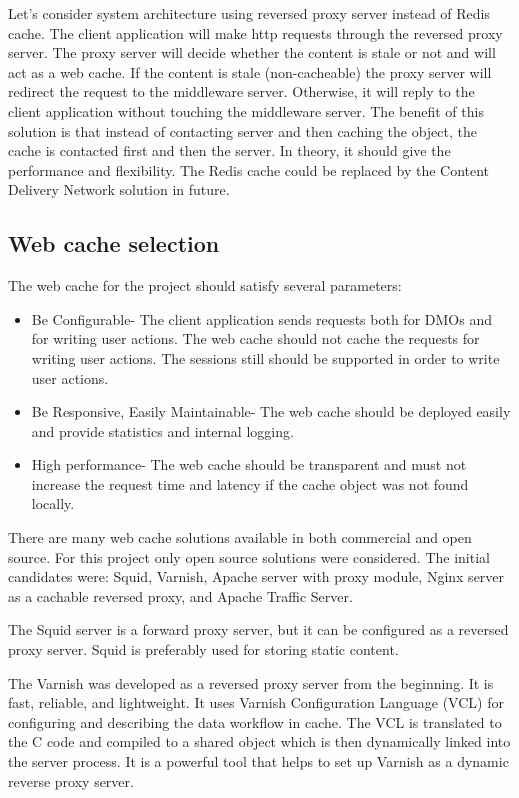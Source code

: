 Let’s consider system architecture using reversed proxy server instead of Redis cache. The client application will make http requests through the reversed proxy server. The proxy server will decide whether the content is stale or not and will act as a web cache. If the content is stale (non-cacheable) the proxy server will redirect the request to the middleware server. Otherwise, it will reply to the client application without touching the middleware server. The benefit of this solution is that instead of contacting server and then caching the object, the cache is contacted first and then the server. In theory, it should give the performance and flexibility. The Redis cache could be replaced by the Content Delivery Network solution in future.


\subsection{Web cache selection}

The web cache for the project should satisfy several parameters:
\begin{itemize}
	\item Be Configurable- The client application sends requests both for DMOs and for writing user actions. The web cache should not cache the requests for writing user actions. The sessions still should be supported in order to write user actions. 
	\item Be Responsive, Easily Maintainable- The web cache should be deployed easily and provide statistics and internal logging. 
	\item High performance- The web cache should be transparent and must not increase the request time and latency if the cache object was not found locally. 
\end{itemize}

There are many web cache solutions available in both commercial and open source. For this project only open source solutions were considered. The initial candidates were: Squid, Varnish, Apache server with proxy module, Nginx server as a cachable reversed proxy, and Apache Traffic Server.

The Squid server is a forward proxy server, but it can be configured as a reversed proxy server. Squid is preferably used for storing static content.

The Varnish was developed as a reversed proxy server from the beginning. It is fast, reliable, and lightweight. It uses Varnish Configuration Language (VCL) for configuring and describing the data workflow in cache. The VCL is translated to the C code and compiled to a shared object which is then dynamically linked into the server process. It is a powerful tool that helps to set up Varnish as a dynamic reverse proxy server.

